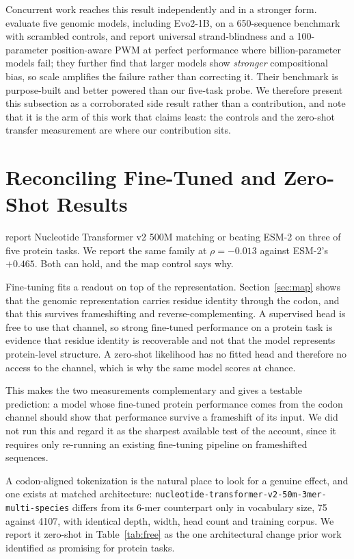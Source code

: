 \documentclass[11pt]{article}
\begin{document}
Concurrent work reaches this result independently and in a stronger form.
\citet{cheng2026invariance} evaluate five genomic models, including Evo2-1B, on a
650-sequence benchmark with scrambled controls, and report universal
strand-blindness and a 100-parameter position-aware PWM at perfect performance
where billion-parameter models fail; they further find that larger models show
\emph{stronger} compositional bias, so scale amplifies the failure rather than
correcting it. Their benchmark is purpose-built and better powered than our
five-task probe. We therefore present this subsection as a corroborated side
result rather than a contribution, and note that it is the arm of this work that
claims least: the controls and the zero-shot transfer measurement are where our
contribution sits.


\section{Reconciling Fine-Tuned and Zero-Shot Results}
\label{sec:tension}
\citet{boshar2024glm} report Nucleotide Transformer v2 500M matching or beating
ESM-2 on three of five protein tasks. We report the same family at $\rho=-0.013$
against ESM-2's $+0.465$. Both can hold, and the map control says why.

Fine-tuning fits a readout on top of the representation. Section~\ref{sec:map}
shows that the genomic representation carries residue identity through the codon,
and that this survives frameshifting and reverse-complementing. A supervised head
is free to use that channel, so strong fine-tuned performance on a protein task is
evidence that residue identity is recoverable and not that the model represents
protein-level structure. A zero-shot likelihood has no fitted head and therefore no
access to the channel, which is why the same model scores at chance.

This makes the two measurements complementary and gives a testable prediction: a
model whose fine-tuned protein performance comes from the codon channel should show
that performance survive a frameshift of its input. We did not run this and regard
it as the sharpest available test of the account, since it requires only re-running
an existing fine-tuning pipeline on frameshifted sequences.

A codon-aligned tokenization is the natural place to look for a genuine effect, and
one exists at matched architecture: \texttt{nucleotide-transformer-v2-50m-3mer-}
\texttt{multi-species} differs from its 6-mer counterpart only in vocabulary size,
75 against 4107, with identical depth, width, head count and training corpus. We
report it zero-shot in Table~\ref{tab:free} as the one architectural change prior
work identified as promising for protein tasks.
\end{document}
